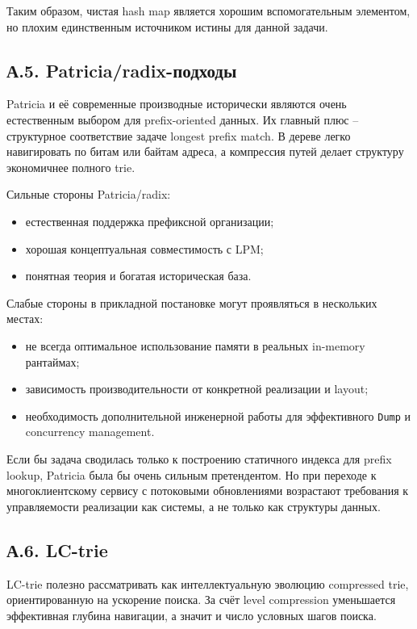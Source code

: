 Таким образом, чистая hash map является хорошим вспомогательным
элементом, но плохим единственным источником истины для данной
задачи.

\subsection*{А.5. Patricia/radix-подходы}

Patricia \cite{morrison1968patricia} и её современные производные
исторически являются очень естественным выбором для prefix-oriented
данных. Их главный плюс -- структурное соответствие задаче longest
prefix match. В дереве легко навигировать по битам или байтам адреса,
а компрессия путей делает структуру экономичнее полного trie.

Сильные стороны Patricia/radix:

\begin{itemize}
\item естественная поддержка префиксной организации;
\item хорошая концептуальная совместимость с LPM;
\item понятная теория и богатая историческая база.
\end{itemize}

Слабые стороны в прикладной постановке могут проявляться в нескольких
местах:

\begin{itemize}
\item не всегда оптимальное использование памяти в реальных in-memory
рантаймах;
\item зависимость производительности от конкретной реализации и
layout;
\item необходимость дополнительной инженерной работы для эффективного
\texttt{Dump} и concurrency management.
\end{itemize}

Если бы задача сводилась только к построению статичного индекса для
prefix lookup, Patricia была бы очень сильным претендентом. Но при
переходе к многоклиентскому сервису с потоковыми обновлениями
возрастают требования к управляемости реализации как системы, а не
только как структуры данных.

\subsection*{А.6. LC-trie}

LC-trie \cite{nilsson1999lctries} полезно рассматривать как
интеллектуальную эволюцию compressed trie, ориентированную на
ускорение поиска. За счёт level compression уменьшается эффективная
глубина навигации, а значит и число условных шагов поиска.

